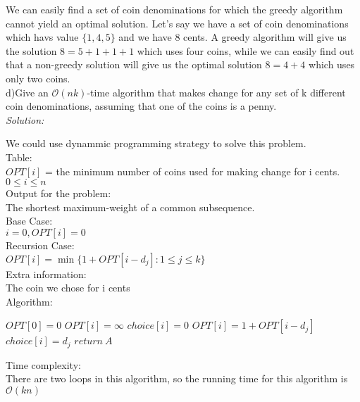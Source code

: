 \documentclass[12pt,letterpaper]{article}
\newcommand{\solution}{\textit{Solution:}\par}
\begin{document}
We can easily find a set of coin denominations for which the greedy algorithm cannot yield an optimal solution. Let's say we have a set of coin denominations which havs value $\{1, 4, 5 \}$ and we have 8 cents. A greedy algorithm will give us the solution $8 = 5 + 1 + 1 + 1$ which uses four coins, while we can easily find out that a non-greedy solution will give us the optimal solution $8 = 4 + 4$ which uses only two coins. \\
d)Give an $\mathcal{O}(nk)$-time algorithm that makes change for any set of k different coin denominations, assuming that one of the coins is a penny. \\
\solution
We could use dynammic programming strategy to solve this problem. \\
Table: \\
$OPT[i]$ = the minimum number of coins used for making change for i cents. $0 \le i \le n$\\
Output for the problem: \\
The shortest maximum-weight of a common subsequence. \\
Base Case: \\
$ i = 0, OPT[i] = 0$ \\
Recursion Case: \\
$OPT[i] = \min \{1 + OPT[i-d_j]: 1 \le j \le k \}$ \\
Extra information: \\
The coin we chose for i cents \\
Algorithm: \\
\begin{algorithm}[H]
$OPT[0] = 0$ \;
{
$OPT[i] = \infty$ \;
$choice[i] = 0$ \;
{
 {
	$OPT[i] = 1 + OPT[i - d_j]$ \;
	$choice[i] = d_j$ \;
	}
}
}
   $return\  A$ \;
\end{algorithm}
Time complexity: \\
There are two loops in this algorithm, so the running time for this algorithm is $\mathcal{O}(kn)$
\end{document}
